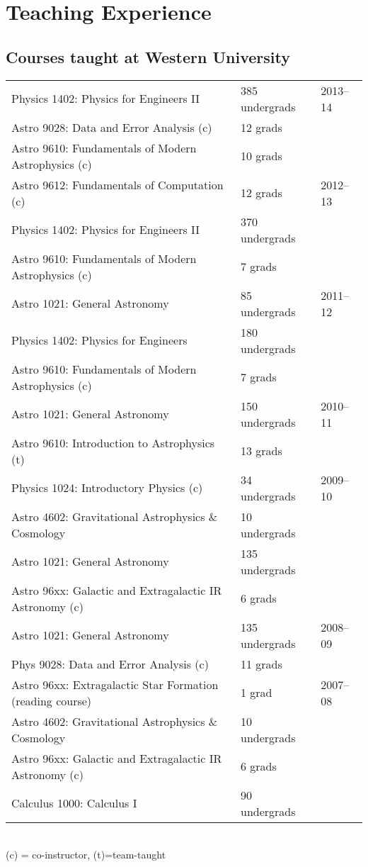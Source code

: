 \documentclass[12pt]{article}
\begin{document}
\section{Teaching Experience}

\subsection{Courses taught at Western University}
\begin{tabular}{p{11cm}ll}
Physics 1402: Physics for Engineers II &  385 undergrads & 2013--14\\ 
Astro 9028: Data and Error Analysis (c) & 12 grads&\\ 
Astro 9610: Fundamentals of Modern Astrophysics (c) & 10 grads&\\  
Astro 9612: Fundamentals of Computation (c) & 12 grads&2012--13\\
Physics 1402: Physics for Engineers II &  370 undergrads&\\ 
Astro 9610:  Fundamentals of Modern Astrophysics (c) & 7 grads&\\ 
Astro 1021: General Astronomy & 85 undergrads&2011--12\\  
Physics 1402: Physics for Engineers &  180 undergrads&\\ 
Astro 9610: Fundamentals of Modern Astrophysics (c) & 7 grads&\\  
Astro 1021: General Astronomy & 150 undergrads&2010--11\\  
Astro 9610: Introduction to Astrophysics (t) & 13 grads&\\  
Physics 1024: Introductory Physics (c)  & 34 undergrads&2009--10\\ 
Astro 4602: Gravitational Astrophysics \& Cosmology & 10 undergrads&\\  
Astro 1021: General Astronomy & 135 undergrads&\\  
Astro 96xx: Galactic and Extragalactic IR Astronomy (c) & 6 grads&\\
Astro 1021: General Astronomy & 135 undergrads& 2008--09\\ 
Phys 9028: Data and Error Analysis (c) &  11 grads&\\ 
Astro 96xx: Extragalactic Star Formation (reading course) & 1 grad& 2007--08\\
Astro 4602: Gravitational Astrophysics \& Cosmology & 10  undergrads&\\ 
Astro 96xx: Galactic and Extragalactic IR Astronomy (c) & 6 grads&\\
Calculus 1000: Calculus I & 90 undergrads&\\
\end{tabular}\\
(c) = co-instructor, (t)=team-taught
\end{document}
